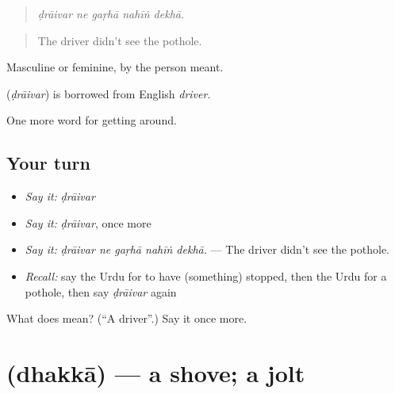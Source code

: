 \begin{quote}
    
\end{quote}

\begin{quote}
\emph{ḍrāivar ne gaṛhā nahīṅ dekhā.}
\end{quote}

\begin{quote}
The driver didn't see the pothole.
\end{quote}

Masculine or feminine, by the person meant.

\begin{cousinweb}
\textbf{} (\emph{ḍrāivar}) is borrowed from English \emph{driver}.
\end{cousinweb}

\begin{grammarlens}[title={What you've built}]
One more word for getting around.
\end{grammarlens}

\subsection*{Your turn}
\begin{itemize}
\raggedright
  \item \emph{Say it:} \emph{ḍrāivar}
  \item \emph{Say it:} \emph{ḍrāivar}, once more
  \item \emph{Say it:} \emph{ḍrāivar ne gaṛhā nahīṅ dekhā.} — The driver didn't see the pothole.
  \item \emph{Recall:} say the Urdu for to have (something) stopped, then the Urdu for a pothole, then say \emph{ḍrāivar} again
\end{itemize}

\begin{tcolorbox}[breakable,colback=teal!4,colframe=teal!35!black,title={Before you move on}]
What does  mean? (\textquotedblleft{}A driver\textquotedblright{}.) Say it once more.
\end{tcolorbox}
\section[\texorpdfstring{\ur{دھکا} (dhakkā)}{دھکا (dhakkā)}]{ (dhakkā) — a shove; a jolt}

\label{lesson:UR-C394-dhakka}



